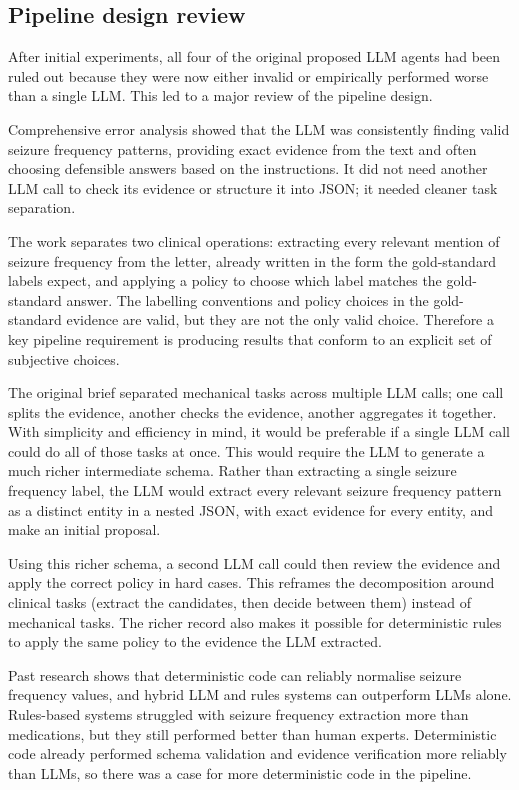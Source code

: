 \documentclass[conference]{IEEEtran}
\begin{document}
\subsection{Pipeline design review}

After initial experiments, all four of the original
proposed LLM agents had been ruled out because
they were now either invalid or empirically performed
worse than a single LLM. This led to a major review
of the pipeline design. 

Comprehensive error analysis showed that the LLM
was consistently finding valid seizure frequency
patterns, providing exact evidence from the text
and often choosing defensible answers based 
on the instructions. It did not need another LLM call to
check its evidence or structure it into JSON; it 
needed cleaner task separation. 

The work separates two clinical operations: extracting 
every relevant mention of seizure frequency from the 
letter, already written in the form the gold-standard 
labels expect, and applying a policy to choose which 
label matches the gold-standard answer. The
labelling conventions and policy choices in the 
gold-standard evidence are valid, but they are not
the only valid choice. Therefore a key pipeline 
requirement is producing results that conform to 
an explicit set of subjective choices. 

The original brief separated mechanical tasks 
across multiple LLM calls; one call splits the 
evidence, another checks the evidence, another 
aggregates it together. With simplicity and 
efficiency in mind, it would be preferable if a 
single LLM call could do all of those tasks at once. 
This would require the LLM to generate a much richer 
intermediate schema. Rather than extracting a single 
seizure frequency label, the LLM would extract
every relevant seizure frequency pattern as 
a distinct entity in a nested JSON, with exact
evidence for every entity, and make an initial 
proposal. 

Using this richer schema, a second LLM call 
could then review the evidence and apply the correct 
policy in hard cases. This reframes the decomposition 
around clinical tasks (extract the candidates, then 
decide between them) instead of mechanical tasks. The 
richer record also makes it possible for deterministic 
rules to apply the same policy to the evidence the LLM 
extracted.

Past research shows that deterministic code
can reliably normalise seizure frequency values,
and hybrid LLM and rules systems can outperform
LLMs alone. Rules-based systems 
struggled with seizure frequency extraction more
than medications, but they still performed better
than human experts. Deterministic code already
performed schema validation and evidence 
verification more reliably than LLMs, so there was 
a case for more deterministic code in the pipeline.
\end{document}
